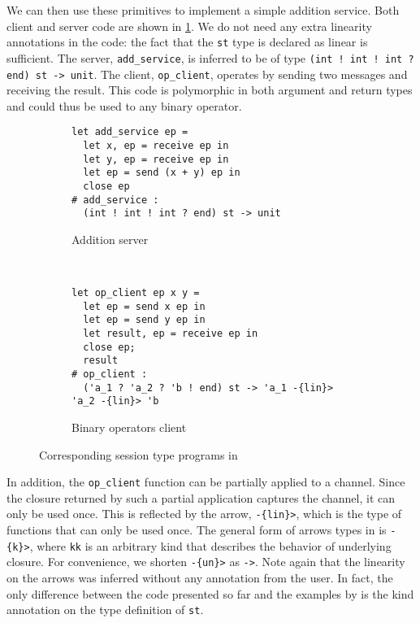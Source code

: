 
We can then use these primitives to implement a simple addition service.
Both client and server code are shown in
\cref{fig:sessiontype}.
We do not need any extra linearity annotations in the code: the fact
that the \texttt{st} type is declared as linear is sufficient.
The server, \lstinline{add_service}, is inferred to be of type
\lstinline{(int ! int ! int ? end) st -> unit}.
The client, \lstinline/op_client/, operates by sending two messages
and receiving the result.
This code is polymorphic in both argument and return types and could thus
be used to any binary operator.
%
\begin{figure}[!h]
  \begin{subfigure}[t]{.5\linewidth}
\begin{lstlisting}
let add_service ep =
  let x, ep = receive ep in
  let y, ep = receive ep in
  let ep = send (x + y) ep in
  close ep
# add_service :
  (int ! int ! int ? end) st -> unit
\end{lstlisting}
    \caption{Addition server}
  \end{subfigure}~
  \begin{subfigure}[t]{.5\linewidth}
\begin{lstlisting}
let op_client ep x y =
  let ep = send x ep in
  let ep = send y ep in
  let result, ep = receive ep in
  close ep;
  result
# op_client :
  ('a_1 ? 'a_2 ? 'b ! end) st -> 'a_1 -{lin}> 'a_2 -{lin}> 'b
\end{lstlisting}
    \caption{Binary operators client}
  \end{subfigure}
  \caption{Corresponding session type programs in \lang}
  \label{fig:sessiontype}
\end{figure}

In addition, the \lstinline/op_client/ function can be partially
applied to a channel. Since the closure returned by such a partial
application captures the channel, it can only be used once.
This is reflected by the arrow, \lstinline/-{lin}>/, which is the
type of functions that can only be used once.
The general form of arrows types in \lang is \lstinline/-{k}>/, where
\lstinline/kk/ is an arbitrary kind that describes the behavior of
underlying closure.
For convenience, we shorten \lstinline/-{un}>/ as \lstinline/->/.
Note again that the linearity on the arrows was inferred without
any annotation from the user. In fact, the only difference between the code
presented so far and the examples by
\citet{DBLP:journals/jfp/Padovani17}
is the kind annotation on the type definition of \lstinline/st/.

